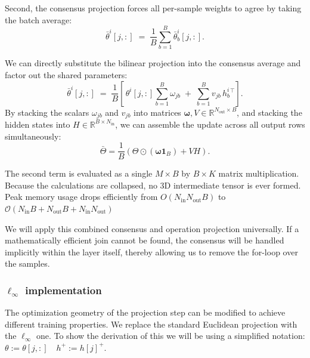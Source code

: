 \documentclass{article}
\theoremstyle{plain}
\theoremstyle{definition}
\theoremstyle{remark}
\begin{document}
Second, the consensus projection forces all per-sample weights to agree by taking the batch average:
\begin{equation}
    \bar\theta^{i}[j,:] \;=\; \frac{1}{B} \sum_{b=1}^{B} \bar\theta^{i}_{b}[j,:].
\end{equation}

We can directly substitute the bilinear projection into the consensus average and factor out the shared parameters:
\begin{equation}
    \bar\theta^{i}[j,:] \;=\; \frac{1}{B}\!\left[\, \theta^{i}[j,:] \sum_{b=1}^{B} \omega_{jb} \;+\; \sum_{b=1}^{B} v_{jb}\, h^{i}_{b}{}^{\top} \right].
\end{equation}
By stacking the scalars $\omega_{jb}$ and $v_{jb}$ into matrices $\boldsymbol{\omega}, V \in \mathbb{R}^{N_{\mathrm{out}} \times B}$, and stacking the hidden states into $H \in \mathbb{R}^{B \times N_{\mathrm{in}}}$, we can assemble the update across all output rows simultaneously:
\begin{equation}
    \bar{\Theta} = \frac{1}{B} \left( \Theta \odot (\boldsymbol{\omega} \mathbf{1}_{B}) + V H \right).
\end{equation}

The second term is evaluated as a single $M \times B$ by $B \times K$ matrix multiplication. Because the calculations are collapsed, no 3D intermediate tensor is ever formed. Peak memory usage drops efficiently from $O(N_{\mathrm{in}}N_{\mathrm{out}}B)$ to $\mathcal{O}(N_{\mathrm{in}}B + N_{\mathrm{out}}B +N_{\mathrm{in}}N_{\mathrm{out}})$

\vspace{0.5em}
\begin{tcolorbox}
We will apply this combined consensus and operation projection universally. If a mathematically efficient join cannot be found, the consensus will be handled implicitly within the layer itself, thereby allowing us to remove the for-loop over the samples.
\end{tcolorbox}
\vspace{0.5em}
\subsubsection{$\ell_\infty$ implementation}
\label{sec:bilinear-inf}
\label{sec:linf}
The optimization geometry of the projection step can be modified to achieve
different training properties. We replace the standard Euclidean projection with
the $\ell_\infty$ one.
To show the derivation of this we will be using a simplified notation: $\theta:=\theta[j,:]\quad h^+:=h[j]^{+}$.
\end{document}

